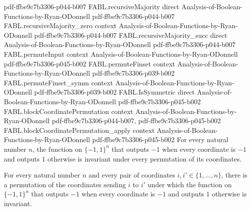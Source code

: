 \begin{theorem}
  {pdf-ffbe9c7b3306-p044-b007}
\proofstep
  {FABL.recursiveMajority}
  {direct}
  {Analysis-of-Boolean-Functions-by-Ryan-ODonnell}
  {pdf-ffbe9c7b3306-p044-b007}
\proofstep
  {FABL.recursiveMajority_zero}
  {context}
  {Analysis-of-Boolean-Functions-by-Ryan-ODonnell}
  {pdf-ffbe9c7b3306-p044-b007}
\proofstep
  {FABL.recursiveMajority_succ}
  {direct}
  {Analysis-of-Boolean-Functions-by-Ryan-ODonnell}
  {pdf-ffbe9c7b3306-p044-b007}
\proofstep
  {FABL.permuteInput}
  {context}
  {Analysis-of-Boolean-Functions-by-Ryan-ODonnell}
  {pdf-ffbe9c7b3306-p045-b002}
\proofstep
  {FABL.permuteFinset}
  {context}
  {Analysis-of-Boolean-Functions-by-Ryan-ODonnell}
  {pdf-ffbe9c7b3306-p039-b002}
\proofstep
  {FABL.permuteFinset_symm}
  {context}
  {Analysis-of-Boolean-Functions-by-Ryan-ODonnell}
  {pdf-ffbe9c7b3306-p039-b002}
\proofstep
  {FABL.IsSymmetric}
  {direct}
  {Analysis-of-Boolean-Functions-by-Ryan-ODonnell}
  {pdf-ffbe9c7b3306-p045-b002}
\proofstep
  {FABL.blockCoordinatePermutation}
  {context}
  {Analysis-of-Boolean-Functions-by-Ryan-ODonnell}
  {pdf-ffbe9c7b3306-p044-b007,
    pdf-ffbe9c7b3306-p045-b002}
\proofstep
  {FABL.blockCoordinatePermutation_apply}
  {context}
  {Analysis-of-Boolean-Functions-by-Ryan-ODonnell}
  {pdf-ffbe9c7b3306-p045-b002}
For every natural number $n$, the function on $\{-1,1\}^n$ that outputs $-1$ when
every coordinate is $-1$ and outputs $1$ otherwise is invariant under every permutation
of its coordinates.
\end{theorem}

\begin{theorem}
\label{FABL.andFunction_transitiveSymmetric}
\leanok
{}
For every natural number $n$ and every pair of coordinates $i,i'\in\{1,\ldots,n\}$,
there is a permutation of the coordinates sending $i$ to $i'$ under which the function
on $\{-1,1\}^n$ that outputs $-1$ when every coordinate is $-1$ and outputs $1$
otherwise is invariant.
\end{theorem}


